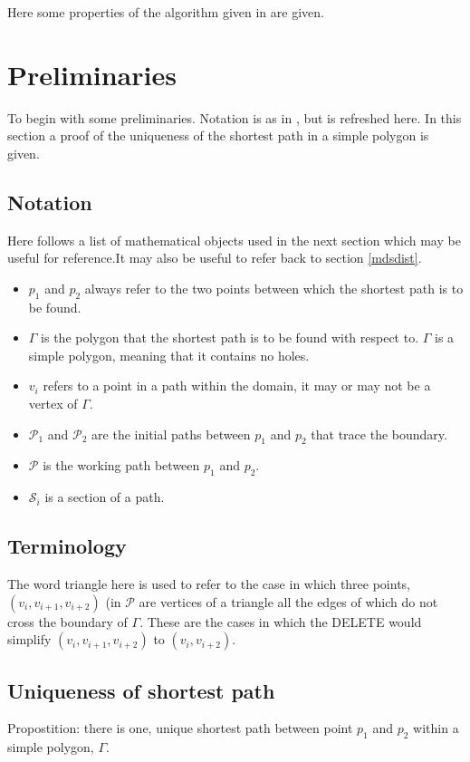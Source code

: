 \label{app-WAD}


Here some properties of the algorithm given in  are given.

\section{Preliminaries}

To begin with some preliminaries. Notation is as in , but is refreshed here. In this section a proof of the uniqueness of the shortest path in a simple polygon is given.

\subsection{Notation}

Here follows a list of mathematical objects used in the next section which may be useful for reference.It may also be useful to refer back to section \ref{mdsdist}.
\begin{itemize}
   \item $p_1$ and $p_2$ always refer to the two points between which the shortest path is to be found.
   \item $\Gamma$ is the polygon that the shortest path is to be found with respect to. $\Gamma$ is a simple polygon, meaning that it contains no holes.
   \item $v_i$ refers to a point in a path within the domain, it may or may not be a vertex of $\Gamma$.
   \item $\mathcal{P}_1$ and $\mathcal{P}_2$ are the initial paths between $p_1$ and $p_2$ that trace the boundary.
   \item $\mathcal{P}$ is the working path between $p_1$ and $p_2$.
   \item$\mathcal{S}_{i}$ is a section of a path.
\end{itemize}

\subsection{Terminology}

The word triangle here is used to refer to the case in which three points, $(v_i,v_{i+1},v_{i+2})$ (in $\mathcal{P}$ are vertices of a triangle all the edges of which do not cross the boundary of $\Gamma$. These are the cases in which the DELETE would simplify $(v_i,v_{i+1},v_{i+2})$ to $(v_i,v_{i+2})$.


\subsection{Uniqueness of shortest path}
\label{app-unique-sp}
Propostition: there is one, unique shortest path between point $p_1$ and $p_2$ within a simple polygon, $\Gamma$.

